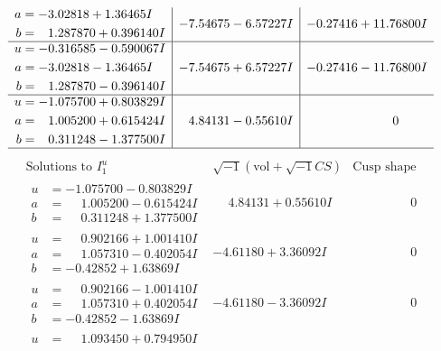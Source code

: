 \documentclass[1p]{elsarticle_modified}
\theoremstyle{definition}
\newcommand{\I}{\sqrt{-1}}
\begin{document}
$$\begin{array}{c|c|c}
\begin{aligned}
a &= -3.02818 + 1.36465 I \\
b &= \phantom{-}1.287870 + 0.396140 I\end{aligned}
 & -7.54675 - 6.57227 I & -0.27416 + 11.76800 I \\ \hline\begin{aligned}
u &= -0.316585 - 0.590067 I \\
a &= -3.02818 - 1.36465 I \\
b &= \phantom{-}1.287870 - 0.396140 I\end{aligned}
 & -7.54675 + 6.57227 I & -0.27416 - 11.76800 I \\ \hline\begin{aligned}
u &= -1.075700 + 0.803829 I \\
a &= \phantom{-}1.005200 + 0.615424 I \\
b &= \phantom{-}0.311248 - 1.377500 I\end{aligned}
 & \phantom{-}4.84131 - 0.55610 I & \phantom{-0.000000 } 0\\
 \hline 
 \end{array}$$\newpage$$\begin{array}{c|c|c}  
\text{Solutions to }I^u_{1}& \I (\text{vol} + \sqrt{-1}CS) & \text{Cusp shape}\\
 \hline 
\begin{aligned}
u &= -1.075700 - 0.803829 I \\
a &= \phantom{-}1.005200 - 0.615424 I \\
b &= \phantom{-}0.311248 + 1.377500 I\end{aligned}
 & \phantom{-}4.84131 + 0.55610 I & \phantom{-0.000000 } 0 \\ \hline\begin{aligned}
u &= \phantom{-}0.902166 + 1.001410 I \\
a &= \phantom{-}1.057310 - 0.402054 I \\
b &= -0.42852 + 1.63869 I\end{aligned}
 & -4.61180 + 3.36092 I & \phantom{-0.000000 } 0 \\ \hline\begin{aligned}
u &= \phantom{-}0.902166 - 1.001410 I \\
a &= \phantom{-}1.057310 + 0.402054 I \\
b &= -0.42852 - 1.63869 I\end{aligned}
 & -4.61180 - 3.36092 I & \phantom{-0.000000 } 0 \\ \hline\begin{aligned}
u &= \phantom{-}1.093450 + 0.794950 I \\

\end{aligned}
\end{array}$$
\end{document}
